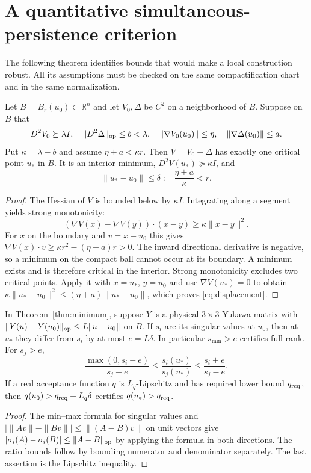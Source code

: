 \section{A quantitative simultaneous-persistence criterion}
The following theorem identifies bounds that would make a local
construction robust. All its assumptions must be checked on the same
compactification chart and in the same normalization.

\begin{theorem}\label{thm:minimum}
Let $B=\overline B_r(u_0)\subset\mathbb R^n$ and let $V_0,\Delta$
be $C^2$ on a neighborhood of $B$. Suppose on $B$ that
\[
 D^2V_0\succeq\lambda I,\quad
 \|D^2\Delta\|_{\rm op}\le b<\lambda,\quad
 \|\nabla V_0(u_0)\|\le\eta,\quad
 \|\nabla\Delta(u_0)\|\le a.
\]
Put $\kappa=\lambda-b$ and assume $\eta+a<\kappa r$.
Then $V=V_0+\Delta$ has exactly one critical point $u_*$ in $B$.
It is an interior minimum, $D^2V(u_*)\succeq\kappa I$, and
\begin{equation}\label{eq:displacement}
 \|u_*-u_0\|\le\delta:=\frac{\eta+a}{\kappa}<r.
\end{equation}
\end{theorem}
\begin{proof}
The Hessian of $V$ is bounded below by $\kappa I$. Integrating along
a segment yields strong monotonicity:
\[
 (\nabla V(x)-\nabla V(y))\cdot(x-y)\ge\kappa\|x-y\|^2.
\]
For $x$ on the boundary and $v=x-u_0$ this gives
$\nabla V(x)\cdot v\ge\kappa r^2-(\eta+a)r>0$.
The inward directional derivative is negative, so a minimum on the
compact ball cannot occur at its boundary. A minimum exists and is
therefore critical in the interior. Strong monotonicity excludes two
critical points. Apply it with $x=u_*$, $y=u_0$ and use
$\nabla V(u_*)=0$ to obtain
$\kappa\|u_*-u_0\|^2\le(\eta+a)\|u_*-u_0\|$,
which proves \eqref{eq:displacement}.
\end{proof}

\begin{proposition}\label{prop:persistence}
In Theorem~\ref{thm:minimum}, suppose $Y$ is a physical $3\times3$ Yukawa
matrix with $\|Y(u)-Y(u_0)\|_{\rm op}\le L\|u-u_0\|$ on $B$.
If $s_i$ are its singular values at $u_0$, then at $u_*$ they differ
from $s_i$ by at most $e=L\delta$. In particular $s_{\min}>e$
certifies full rank. For $s_j>e$,
\[
 \frac{\max(0,s_i-e)}{s_j+e}
 \le\frac{s_i(u_*)}{s_j(u_*)}
 \le\frac{s_i+e}{s_j-e}.
\]
If a real acceptance function $q$ is $L_q$-Lipschitz and has required
lower bound $q_{\rm req}$, then
$q(u_0)>q_{\rm req}+L_q\delta$ certifies $q(u_*)>q_{\rm req}$.
\end{proposition}
\begin{proof}
The min--max formula for singular values and
$|\|Av\|-\|Bv\||\le\|(A-B)v\|$ on unit vectors give
$|\sigma_i(A)-\sigma_i(B)|\le\|A-B\|_{\rm op}$ by applying the
formula in both directions. The ratio bounds follow by bounding numerator
and denominator separately. The last assertion is the Lipschitz inequality.
\end{proof}

